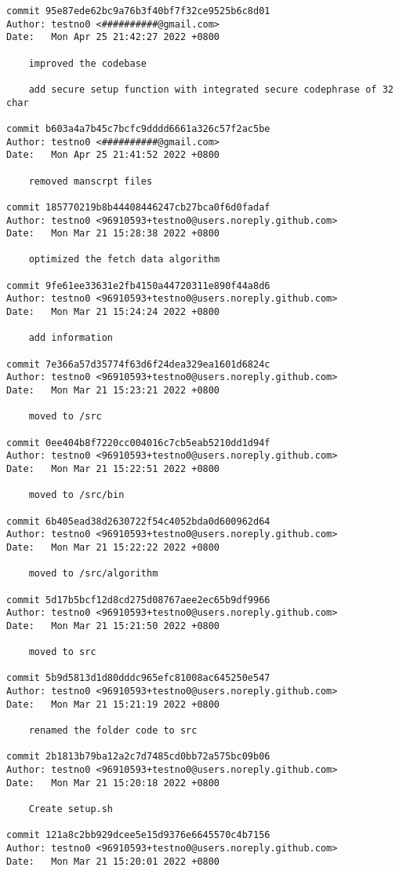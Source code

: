 \documentclass[12pt]{article}
\begin{document}
\begin{lstlisting}[caption={\texttt{git} log of the development.}]
commit 95e87ede62bc9a76b3f40bf7f32ce9525b6c8d01
Author: testno0 <##########@gmail.com>
Date:   Mon Apr 25 21:42:27 2022 +0800

	improved the codebase

	add secure setup function with integrated secure codephrase of 32 char

commit b603a4a7b45c7bcfc9dddd6661a326c57f2ac5be
Author: testno0 <##########@gmail.com>
Date:   Mon Apr 25 21:41:52 2022 +0800

	removed manscrpt files

commit 185770219b8b44408446247cb27bca0f6d0fadaf
Author: testno0 <96910593+testno0@users.noreply.github.com>
Date:   Mon Mar 21 15:28:38 2022 +0800

	optimized the fetch data algorithm

commit 9fe61ee33631e2fb4150a44720311e890f44a8d6
Author: testno0 <96910593+testno0@users.noreply.github.com>
Date:   Mon Mar 21 15:24:24 2022 +0800

	add information

commit 7e366a57d35774f63d6f24dea329ea1601d6824c
Author: testno0 <96910593+testno0@users.noreply.github.com>
Date:   Mon Mar 21 15:23:21 2022 +0800

	moved to /src

commit 0ee404b8f7220cc004016c7cb5eab5210dd1d94f
Author: testno0 <96910593+testno0@users.noreply.github.com>
Date:   Mon Mar 21 15:22:51 2022 +0800

	moved to /src/bin

commit 6b405ead38d2630722f54c4052bda0d600962d64
Author: testno0 <96910593+testno0@users.noreply.github.com>
Date:   Mon Mar 21 15:22:22 2022 +0800

	moved to /src/algorithm

commit 5d17b5bcf12d8cd275d08767aee2ec65b9df9966
Author: testno0 <96910593+testno0@users.noreply.github.com>
Date:   Mon Mar 21 15:21:50 2022 +0800

	moved to src

commit 5b9d5813d1d80dddc965efc81008ac645250e547
Author: testno0 <96910593+testno0@users.noreply.github.com>
Date:   Mon Mar 21 15:21:19 2022 +0800

	renamed the folder code to src

commit 2b1813b79ba12a2c7d7485cd0bb72a575bc09b06
Author: testno0 <96910593+testno0@users.noreply.github.com>
Date:   Mon Mar 21 15:20:18 2022 +0800

	Create setup.sh

commit 121a8c2bb929dcee5e15d9376e6645570c4b7156
Author: testno0 <96910593+testno0@users.noreply.github.com>
Date:   Mon Mar 21 15:20:01 2022 +0800


\end{lstlisting}
\end{document}
